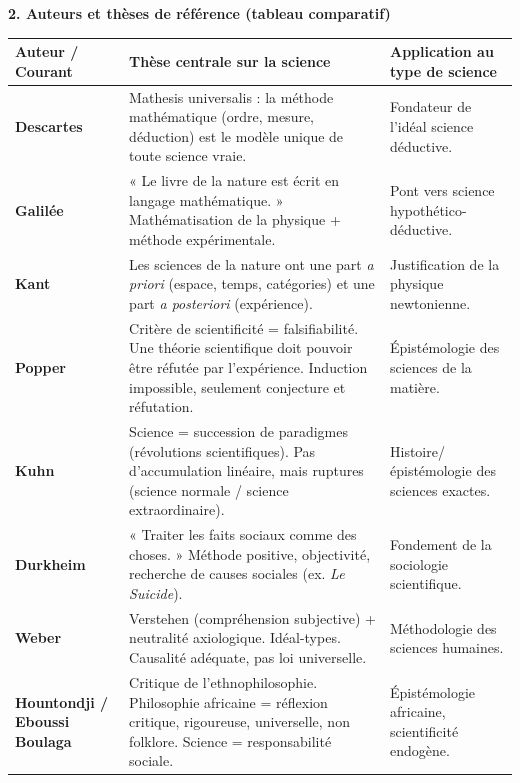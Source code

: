 \documentclass[11pt]{article}
\newcommand{\cle}[1]{{\popxbold\color{popdark}#1}}
\begin{document}
\begin{bilan}
\textbf{2. Auteurs et thèses de référence (tableau comparatif)}
\begin{center}
\begin{tabularx}{\linewidth}{|l|X|X|}\hline
\rowcolor{popblueL}
\textbf{Auteur / Courant} & \textbf{Thèse centrale sur la science} & \textbf{Application au type de science} \\\hline
\textbf{Descartes} & Mathesis universalis : la méthode mathématique (ordre, mesure, déduction) est le modèle unique de toute science vraie. & Fondateur de l'idéal \cle{science déductive}. \\\hline
\textbf{Galilée} & « Le livre de la nature est écrit en langage mathématique. » Mathématisation de la physique + méthode expérimentale. & Pont vers \cle{science hypothético-déductive}. \\\hline
\textbf{Kant} & Les sciences de la nature ont une part \emph{a priori} (espace, temps, catégories) et une part \emph{a posteriori} (expérience). & Justification de la physique newtonienne. \\\hline
\textbf{Popper} & Critère de scientificité = \cle{falsifiabilité}. Une théorie scientifique doit pouvoir être réfutée par l'expérience. Induction impossible, seulement conjecture et réfutation. & Épistémologie des \cle{sciences de la matière}. \\\hline
\textbf{Kuhn} & Science = succession de \cle{paradigmes} (révolutions scientifiques). Pas d'accumulation linéaire, mais ruptures (science normale / science extraordinaire). & Histoire/épistémologie des sciences exactes. \\\hline
\textbf{Durkheim} & « Traiter les faits sociaux comme des choses. » Méthode positive, objectivité, recherche de causes sociales (ex. \emph{Le Suicide}). & Fondement de la \cle{sociologie scientifique}. \\\hline
\textbf{Weber} & \cle{Verstehen} (compréhension subjective) + neutralité axiologique. Idéal-types. Causalité adéquate, pas loi universelle. & Méthodologie des \cle{sciences humaines}. \\\hline
\textbf{Hountondji / Eboussi Boulaga} & Critique de l'ethnophilosophie. Philosophie africaine = réflexion critique, rigoureuse, universelle, non folklore. Science = responsabilité sociale. & Épistémologie africaine, scientificité endogène. \\\hline
\end{tabularx}
\end{center}


\end{bilan}
\end{document}
